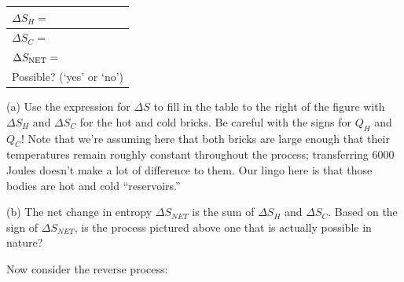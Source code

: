 \begin{center}
\hspace{0.5in}
{\renewcommand{\arraystretch}{1.8}
\begin{tabular}{|L{1.6in}|} 
\hline $\Delta S_H =$ \\ 
\hline $\Delta S_C =$ \\ 
\hline $\Delta S_{\rm NET} =$ \\ 
\hline Possible? \linebreak (`yes' or `no')   \\ 
\hline 
\end{tabular} 
}
\end{center}

(a) Use the expression for $\Delta S$ to fill in the table to the right of the figure with $\Delta S_H$ and $\Delta S_C$ for the hot and cold bricks.  Be careful with the signs for $Q_H$ and $Q_C$!  
Note that we're assuming here that both bricks are large enough that their temperatures remain roughly constant throughout the process; transferring 6000 Joules doesn't make a lot of difference to them.  Our lingo here is that those bodies are hot and cold ``reservoirs.''   
\answerspace{0.2 in}

(b) The net change in entropy $\Delta S_{NET}$ is the sum of $\Delta S_H$ and $\Delta S_C$.  Based on the sign of $\Delta S_{NET}$, is the process pictured above one that is actually possible in nature?
\answerspace{0.6 in}

\pagebreak[2]
Now consider the reverse process:

